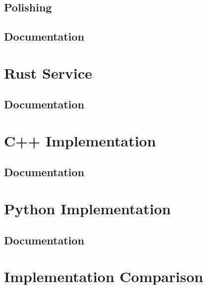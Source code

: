 \subsection{Polishing}

\subsection{Documentation}

\section{Rust Service}
\subsection{Documentation}

\section{C++ Implementation}
\subsection{Documentation}

\section{Python Implementation}

\subsection{Documentation}

\section{Implementation Comparison}

\filbreak
